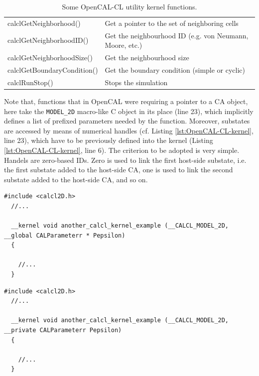 \begin{table}
\begin{footnotesize}
\begin{tabular}{l|l}
    calclGetNeighborhood()         & Get a pointer to the set of neighboring cells \\
    calclGetNeighborhoodID()       & Get the neighbourhood ID (e.g. von Neumann, Moore, etc.) \\
    calclGetNeighborhoodSize()     & Get the neighbourhood size \\
    calclGetBoundaryCondition()    & Get the boundary condition (simple or cyclic) \\
    calclRunStop()                 & Stops the simulation \\
    \hline
    \end{tabular}
    \end{footnotesize}
  \caption{Some OpenCAL-CL utility kernel functions.}
  \label{tab:kernel-utility-function}
\end{table}

Note that, functions that in OpenCAL were requiring a pointer to a CA
object, here take the \verb'MODEL_2D' macro-like C object in its place
(line 23), which implicitly defines a list of prefixed parameters
needed by the function. Moreover, substates are accessed by means of
numerical handles (cf. Listing \ref{lst:OpenCAL-CL-kernel}, line 23),
which have to be previously defined into the kernel (Listing
\ref{lst:OpenCAL-CL-kernel}, line 6). The criterion to be adopted is
very simple. Handels are zero-based IDs. Zero is used to link the
first host-side substate, i.e. the first substate added to the
host-side CA, one is used to link the second substate added to the
host-side CA, and so on.

\begin{lstlisting}[float,floatplacement=H, label=lst:Another-OpenCAL-CL-kernel, caption={Another example of OpenCAL-CL kernel, with an additional global parameter.}]
  #include <calcl2D.h>
  //...

  __kernel void another_calcl_kernel_example (__CALCL_MODEL_2D, __global CALParameterr * Pepsilon)
  {

    //...
  }
\end{lstlisting}

\begin{lstlisting}[float,floatplacement=H, label=lst:kernel-private-parameter, caption={Another example of OpenCAL-CL kernel, with an additional private parameter.}]
  #include <calcl2D.h>
  //...

  __kernel void another_calcl_kernel_example (__CALCL_MODEL_2D, __private CALParameterr Pepsilon)
  {

    //...
  }
\end{lstlisting}



